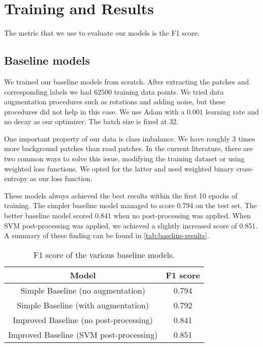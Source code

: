 \section{Training and Results}
The metric that we use to evaluate our models is the F1 score.

\subsection{Baseline models} \label{subsec:training-baselines}
We trained our baseline models from scratch. After extracting the patches and corresponding labels we had $62500$ training data points. We tried data augmentation procedures such as rotations and adding noise, but these procedures did not help in this case. We use Adam with a $0.001$ learning rate and no decay as our optimizer. The batch size is fixed at $32$.

One important property of our data is class imbalance. We have roughly $3$ times more background patches than road patches. In the current literature, there are two common ways to solve this issue, modifying the training dataset or using weighted loss functions. We opted for the latter and used weighted binary cross-entropy as our loss function.

These models always achieved the best results within the first 10 epochs of training. The simpler baseline model managed to score 0.794 on the test set. The better baseline model scored 0.841 when no post-processing was applied. When SVM post-processing was applied, we achieved a slightly increased score of 0.851. A summary of these finding can be found in \autoref{tab:baseline-results}.

\begin{table}[h]
    \centering
    \begin{tabular}{|c|c|}
        \hline
        \textbf{Model} & \textbf{F1 score} \\
        \hline
        \hline
        Simple Baseline (no augmentation) & 0.794 \\
        \hline
        Simple Baseline (with augmentation) & 0.792 \\
        \hline
        Improved Baseline (no post-processing) & 0.841 \\
        \hline
        Improved Baseline (SVM post-processing) & 0.851 \\
        \hline
    \end{tabular}
    \caption{F1 score of the various baseline models.}
    \label{tab:baseline-results}
\end{table}


